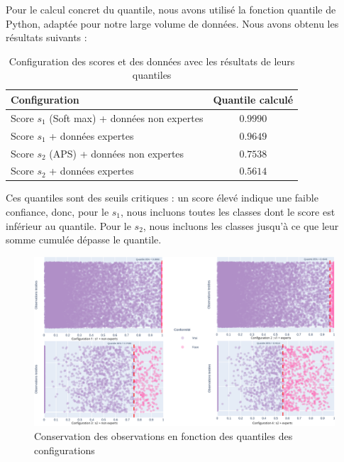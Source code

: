\documentclass[a4paper,12pt]{article}
\begin{document}
\vspace{0.2cm}

Pour le calcul concret du quantile, nous avons utilisé la fonction quantile de Python, adaptée pour notre large volume de données. Nous avons obtenu les résultats suivants : 

\begin{table}[H]
\centering
    \begin{tabular}{|l|c|}
        \hline
        \textbf{Configuration} & \textbf{Quantile calculé} \\
        \hline
        Score $s_1$ (Soft max) + données non expertes & $0.9990$ \\
        Score $s_1$ + données expertes & $0.9649$ \\
        Score $s_2$ (APS) + données non expertes & $0.7538$ \\
        Score $s_2$ + données expertes & $0.5614$ \\
        \hline
        \end{tabular}
    \caption{Configuration des scores et des données avec les résultats de leurs quantiles}
    \label{tab: scores et quantiles}
\end{table}

\vspace{0.2cm}

Ces quantiles sont des seuils critiques : un score élevé indique une faible confiance, donc, pour le $s_1$, nous incluons toutes les classes dont le score est inférieur au quantile. Pour le $s_2$, nous incluons les classes jusqu'à ce que leur somme cumulée dépasse le quantile.

\begin{figure}[H]
    \centering
        \includegraphics[width=1\linewidth]{images/quantiles.png}
    \caption{Conservation des observations en fonction des quantiles des configurations}
    \label{fig:quantiles}
\end{figure}
\end{document}

